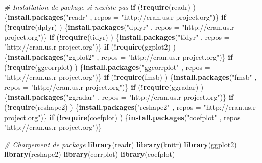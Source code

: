 \documentclass[
  6pt,
]{article}
\newenvironment{Shaded}{\begin{snugshade}}{\end{snugshade}}
\newcommand{\AttributeTok}[1]{\textcolor[rgb]{0.13,0.29,0.53}{#1}}
\newcommand{\CommentTok}[1]{\textcolor[rgb]{0.56,0.35,0.01}{\textit{#1}}}
\newcommand{\ControlFlowTok}[1]{\textcolor[rgb]{0.13,0.29,0.53}{\textbf{#1}}}
\newcommand{\FunctionTok}[1]{\textcolor[rgb]{0.13,0.29,0.53}{\textbf{#1}}}
\newcommand{\NormalTok}[1]{#1}
\newcommand{\SpecialCharTok}[1]{\textcolor[rgb]{0.81,0.36,0.00}{\textbf{#1}}}
\newcommand{\StringTok}[1]{\textcolor[rgb]{0.31,0.60,0.02}{#1}}
\begin{document}
\begin{Shaded}
\begin{Highlighting}[]
\CommentTok{\# Installation de package si n\textquotesingle{}existe pas }
\ControlFlowTok{if}\NormalTok{ (}\SpecialCharTok{!}\FunctionTok{require}\NormalTok{(readr) ) \{}\FunctionTok{install.packages}\NormalTok{(}\StringTok{"readr"}\NormalTok{ , }\AttributeTok{repos =} \StringTok{"http://cran.us.r{-}project.org"}\NormalTok{)\}}
\ControlFlowTok{if}\NormalTok{ (}\SpecialCharTok{!}\FunctionTok{require}\NormalTok{(dplyr) ) \{}\FunctionTok{install.packages}\NormalTok{(}\StringTok{"dplyr"}\NormalTok{ , }\AttributeTok{repos =} \StringTok{"http://cran.us.r{-}project.org"}\NormalTok{)\}}
\ControlFlowTok{if}\NormalTok{ (}\SpecialCharTok{!}\FunctionTok{require}\NormalTok{(tidyr) ) \{}\FunctionTok{install.packages}\NormalTok{(}\StringTok{"tidyr"}\NormalTok{ , }\AttributeTok{repos =} \StringTok{"http://cran.us.r{-}project.org"}\NormalTok{)\}}
\ControlFlowTok{if}\NormalTok{ (}\SpecialCharTok{!}\FunctionTok{require}\NormalTok{(ggplot2) ) \{}\FunctionTok{install.packages}\NormalTok{(}\StringTok{"ggplot2"}\NormalTok{ , }\AttributeTok{repos =} \StringTok{"http://cran.us.r{-}project.org"}\NormalTok{)\}}
\ControlFlowTok{if}\NormalTok{ (}\SpecialCharTok{!}\FunctionTok{require}\NormalTok{(ggcorrplot) ) \{}\FunctionTok{install.packages}\NormalTok{(}\StringTok{"ggcorrplot"}\NormalTok{ , }\AttributeTok{repos =} \StringTok{"http://cran.us.r{-}project.org"}\NormalTok{)\}}
\ControlFlowTok{if}\NormalTok{ (}\SpecialCharTok{!}\FunctionTok{require}\NormalTok{(fmsb) ) \{}\FunctionTok{install.packages}\NormalTok{(}\StringTok{"fmsb"}\NormalTok{ , }\AttributeTok{repos =} \StringTok{"http://cran.us.r{-}project.org"}\NormalTok{)\}}
\ControlFlowTok{if}\NormalTok{ (}\SpecialCharTok{!}\FunctionTok{require}\NormalTok{(ggradar) ) \{}\FunctionTok{install.packages}\NormalTok{(}\StringTok{"ggradar"}\NormalTok{ , }\AttributeTok{repos =} \StringTok{"http://cran.us.r{-}project.org"}\NormalTok{)\}}
\ControlFlowTok{if}\NormalTok{ (}\SpecialCharTok{!}\FunctionTok{require}\NormalTok{(reshape2) ) \{}\FunctionTok{install.packages}\NormalTok{(}\StringTok{"reshape2"}\NormalTok{ , }\AttributeTok{repos =} \StringTok{"http://cran.us.r{-}project.org"}\NormalTok{)\}}
\ControlFlowTok{if}\NormalTok{ (}\SpecialCharTok{!}\FunctionTok{require}\NormalTok{(coefplot) ) \{}\FunctionTok{install.packages}\NormalTok{(}\StringTok{"coefplot"}\NormalTok{ , }\AttributeTok{repos =} \StringTok{"http://cran.us.r{-}project.org"}\NormalTok{)\}}

\CommentTok{\# Chargement de package }
\FunctionTok{library}\NormalTok{(readr)}
\FunctionTok{library}\NormalTok{(knitr)}
\FunctionTok{library}\NormalTok{(ggplot2)}
\FunctionTok{library}\NormalTok{(reshape2)}
\FunctionTok{library}\NormalTok{(corrplot)}
\FunctionTok{library}\NormalTok{(coefplot)}



\end{Highlighting}
\end{Shaded}
\end{document}
